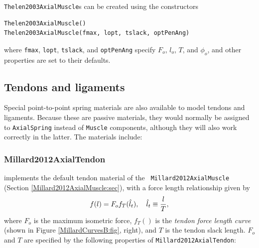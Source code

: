 {\tt Thelen2003AxialMuscle}s can be created using the constructors
\begin{lstlisting}[]
Thelen2003AxialMuscle()
Thelen2003AxialMuscle(fmax, lopt, tslack, optPenAng)
\end{lstlisting}
%
where {\tt fmax}, {\tt lopt}, {\tt tslack}, and {\tt optPenAng}
specify $F_{o}$, $l_o$, $T$, and $\phi_o$, and other properties are
set to their defaults.





\subsection{Tendons and ligaments}
\label{TendonsAndLigaments:sec}

Special point-to-point spring materials are also available to model
tendons and ligaments. Because these are passive materials, they would
normally be assigned to {\tt AxialSpring} instead of {\tt Muscle}
components, although they will also work correctly in the latter.  The
materials include:

\subsubsection{Millard2012AxialTendon}

implements the default tendon material of the {\tt
Millard2012AxialMuscle} (Section \ref{Millard2012AxialMuscle:sec}),
with a force length relationship given by
%
\begin{equation}
f(l) = F_o f_T (\hat{l}_t), \quad \hat{l}_t \equiv \frac{l}{T},
\end{equation}
%
where $F_o$ is the maximum isometric force, $f_T()$ is the {\it tendon
force length curve} (shown in Figure \ref{MillardCurvesB:fig},
right), and $T$ is the tendon slack length. $F_o$ and $T$ are specified
by the following properties of {\tt Millard2012AxialTendon}:

